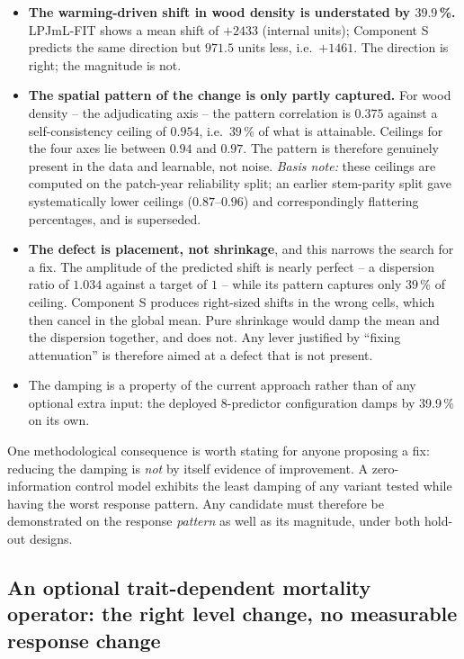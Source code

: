 \documentclass[11pt]{article}
\begin{document}
\begin{itemize}[leftmargin=1.4em]
\item \textbf{The warming-driven shift in wood density is understated by $39.9$\,\%.} LPJmL-FIT shows a mean shift of $+2433$ (internal units); Component S predicts the same direction but $971.5$ units less, i.e.\ $+1461$. The direction is right; the magnitude is not.
\item \textbf{The spatial pattern of the change is only partly captured.} For wood density -- the adjudicating axis -- the pattern correlation is $0.375$ against a self-consistency ceiling of $0.954$, i.e.\ $39$\,\% of what is attainable. Ceilings for the four axes lie between $0.94$ and $0.97$. The pattern is therefore genuinely present in the data and learnable, not noise. \emph{Basis note:} these ceilings are computed on the patch-year reliability split; an earlier stem-parity split gave systematically lower ceilings ($0.87$--$0.96$) and correspondingly flattering percentages, and is superseded.
\item \textbf{The defect is placement, not shrinkage}, and this narrows the search for a fix. The amplitude of the predicted shift is nearly perfect -- a dispersion ratio of $1.034$ against a target of $1$ -- while its pattern captures only $39$\,\% of ceiling. Component S produces right-sized shifts in the wrong cells, which then cancel in the global mean. Pure shrinkage would damp the mean and the dispersion together, and does not. Any lever justified by ``fixing attenuation'' is therefore aimed at a defect that is not present.
\item The damping is a property of the current approach rather than of any optional extra input: the deployed 8-predictor configuration damps by 39.9\,\% on its own.
\end{itemize}

One methodological consequence is worth stating for anyone proposing a fix: reducing the damping is \emph{not} by itself evidence of improvement. A zero-information control model exhibits the least damping of any variant tested while having the worst response pattern. Any candidate must therefore be demonstrated on the response \emph{pattern} as well as its magnitude, under both hold-out designs.

\subsection{An optional trait-dependent mortality operator: the right level change, no measurable response change}
\label{sec:traitmort}
\end{document}
